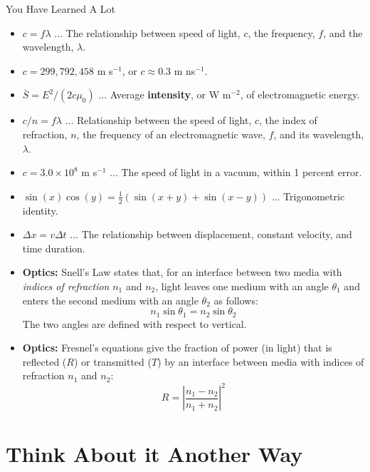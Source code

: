 \documentclass{beamer}
\begin{document}
\begin{frame}{You Have Learned A Lot}
\scriptsize
\begin{itemize}
\item $c = f\lambda$ ... The relationship between speed of light, $c$, the frequency, $f$, and the wavelength, $\lambda$.
\item $c = 299,792,458$ m s$^{-1}$, or $c \approx 0.3$ m ns$^{-1}$.
\item $\bar{S} = E^2/(2c\mu_0)$ ... Average \textbf{intensity}, or W m$^{-2}$, of electromagnetic energy.
\item $c/n = f \lambda$ ... Relationship between the speed of light, $c$, the index of refraction, $n$, the frequency of an electromagnetic wave, $f$, and its wavelength, $\lambda$.
\item $c = 3.0 \times 10^8$ m s$^{-1}$ ... The speed of light in a vacuum, within 1 percent error.
\item $\sin(x)\cos(y) = \frac{1}{2}\left(\sin(x+y) + \sin(x-y)\right)$ ... Trigonometric identity.
\item $\Delta x = v \Delta t$ ... The relationship between displacement, constant velocity, and time duration.
\item \textbf{Optics:} Snell's Law states that, for an interface between two media with \textit{indices of refraction} $n_1$ and $n_2$, light leaves one medium with an angle $\theta_1$ and enters the second medium with an angle $\theta_2$ as follows:
\begin{equation}
n_1 \sin\theta_1 = n_2\sin\theta_2
\end{equation}
\noindent The two angles are defined with respect to vertical.
\item \textbf{Optics:} Fresnel's equations give the fraction of power (in light) that is reflected ($R$) or transmitted ($T$) by an interface between media with indices of refraction $n_1$ and $n_2$:
\begin{equation}
R = \left| \frac{n_1 - n_2}{n_1 + n_2} \right|^2 \label{eq:2}
\end{equation}
\end{itemize}
\end{frame}

\section{Think About it Another Way}
\end{document}
